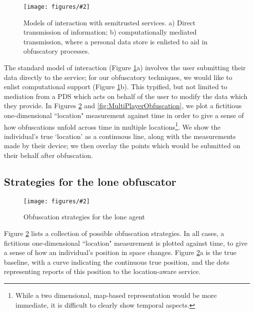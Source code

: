 \documentclass{IOS-Book-Article}     %
\newcommand{\fig}[3][0.9]{
\begin{figure}[tp]
\begin{center}
\texttt{[image: figures/\#2]}
\caption{#3}
\label{fig:#2}
\end{center}
\end{figure}
}
\begin{document}
\fig{Mediation}{Models of interaction with semitrusted services. a) Direct
transmission of information; b) computationally mediated transmission, where a
personal data store is enlisted to aid in obfuscatory processes.}

The standard model of interaction (Figure \ref{fig:Mediation}a) involves the
user submitting their data directly to the service; for our obfuscatory
techniques, we would like to enlist computational support (Figure
\ref{fig:Mediation}b). This typified, but not limited to mediation from a PDS
which acts on behalf of the user to modify the data which they provide.
In Figures \ref{fig:SinglePlayerObfuscation} and
\ref{fig:MultiPlayerObfuscation}, we plot a fictitious one-dimensional
``location" measurement against time in order to give a sense of how
obfuscations unfold across time in multiple locations\footnote{While a two
dimensional, map-based representation would be more immediate, it is difficult
to clearly show temporal aspects.}. We show the individual's true `location' as
a continuous line, along with the measurements made by their device; we then
overlay the points which would be submitted on their behalf after obfuscation.

\subsection{Strategies for the lone obfuscator}

\fig[1.05]{SinglePlayerObfuscation}{Obfuscation strategies for the lone agent}

Figure \ref{fig:SinglePlayerObfuscation} lists a collection of possible
obfuscation strategies. In all cases, a fictitious one-dimensional ``location"
measurement is plotted against time, to give a sense of how an
individual's position in space changes. Figure
\ref{fig:SinglePlayerObfuscation}a is the true baseline, with a 
curve indicating the continuous true position, and the dots
representing reports of this position to the location-aware service. 
\end{document}
